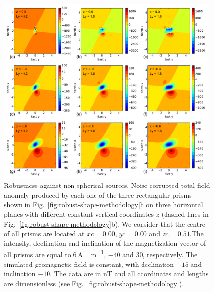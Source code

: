 \documentclass[journal abbreviation, npg]{copernicus}
\begin{document}
\begin{figure}[t]
\includegraphics[width=110mm]{Figures/npgd-2014-0069-f05}
\caption{Robustness against non-spherical sources. Noise-corrupted
  total-field anomaly produced by each one of the three rectangular
  prisms shown in Fig.~\ref{fig:robust-shape-methodology}b on three
  horizontal planes with different constant vertical coordinates $z$
  (dashed lines in Fig.~\ref{fig:robust-shape-methodology}b). We
  consider that the centre of all prisms are located at $xc = 0.00$,
  $yc = 0.00$ and $zc = 0.51$.The intensity, declination and
  inclination of the magnetization vector of all prisms are equal to
  $6$\,\unit{A\,m^{-1}}, $-40${\degree} and $30${\degree},
  respectively. The simulated geomagnetic field is constant, with
  declination $-15${\degree} and inclination $-10${\degree}. The data
  are in nT and all coordinates and lengths are dimensionless (see
  Fig.~\ref{fig:robust-shape-methodology}).}
\label{fig:robust-shape-data}
\end{figure}
\end{document}
